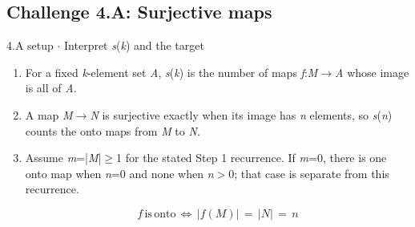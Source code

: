 \documentclass[11pt]{article}
\begin{document}
\begin{keepsection}\subsection{Challenge 4.A: Surjective maps}

\begin{workedbox}{4.A setup \ensuremath{\cdot} Interpret \textit{s}(\textit{k}) and the target}
\begin{enumerate}
\item For a fixed \textit{k}-element set \textit{A}, \textit{s}(\textit{k}) is the number of maps \textit{f}:\textit{M}\ensuremath{\to}\textit{A} whose image is all of \textit{A}.
\item A map \textit{M}\ensuremath{\to}\textit{N} is surjective exactly when its image has \textit{n} elements, so \textit{s}(\textit{n}) counts the onto maps from \textit{M} to \textit{N}.
\item {}
Assume \textit{m}=|\textit{M}|\ensuremath{\geq}1 for the stated Step 1 recurrence. If \textit{m}=0, there is one onto map when \textit{n}=0 and none when \textit{n}\ensuremath{>}0; that case is separate from this recurrence.

\begin{equation*}{f}\, \text{is}\, \text{onto}\, \Leftrightarrow \, |{f}({M})|\, =\, |{N}|\, =\, {n}\end{equation*}
\end{enumerate}
\end{workedbox}

\end{keepsection}
\end{document}
